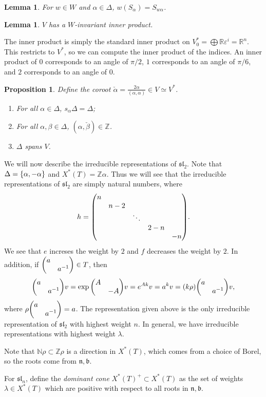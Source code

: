 \documentclass[leqno, openany]{memoir}
\newtheorem{prop}[thm]{Proposition}
\newtheorem{lem}[thm]{Lemma}
\theoremstyle{definition}
\theoremstyle{remark}
\theoremstyle{plain}
\theoremstyle{definition}
\theoremstyle{remark}
\newcommand{\R}{\mathbb{R}}
\newcommand{\Z}{\mathbb{Z}}
\newcommand{\ep}{\varepsilon}
\newcommand{\mf}[1]{\mathfrak{#1}}
\newcommand{\mb}[1]{\mathbb{#1}}
\begin{document}
\begin{lem}
    For $w \in W$ and $\alpha \in \Delta$, $w(S_{\alpha}) = S_{w\alpha}$.
\end{lem}

\begin{lem}
    $V$ has a $W$-invariant inner product.
\end{lem}

The inner product is simply the standard inner product on $V_0^* = \bigoplus \R \ep^i = \R^n$. This restricts to $V^*$, so we can compute the inner product of the indices. An inner product of $0$ corresponds to an angle of $\pi/2$, $1$ corresponds to an angle of $\pi/6$, and $2$ corresponds to an angle of $0$.

\begin{prop}
    Define the coroot $\check{\alpha} = \frac{2 \alpha}{(\alpha, \alpha)} \in V \simeq V^*$.
    \begin{enumerate}
        \item For all $\alpha \in \Delta$, $s_{\alpha} \Delta = \Delta$;
        \item For all $\alpha, \beta \in \Delta$, $(\alpha, \check{\beta}) \in \Z$.
        \item $\Delta$ spans $V$.
    \end{enumerate}
\end{prop}

We will now describe the irreducible representations of $\mf{sl}_2$. Note that $\Delta = \qty{\alpha, -\alpha}$ and $X^*(T) = \Z \alpha$. Thus we will see that the irreducible representations of $\mf{sl}_2$ are simply natural numbers, where
\[ h = \mqty(\dmat{n,n-2,\ddots,2-n,-n}). \]
We see that $e$ increses the weight by $2$ and $f$ decreases the weight by $2$. In addition, if $\mqty(\dmat{a,a^{-1}}) \in T$, then 
\[ \mqty(\dmat{a,a^{-1}}) v = \exp \mqty(\dmat{A,-A}) v = e^{Ak} v = a^k v = (k\rho) \mqty(\dmat{a,a^{-1}}) v, \]
where $\rho \mqty(\dmat{a,a^{-1}}) = a$. The representation given above is the only irreducible representation of $\mf{sl}_2$ with highest weight $n$. In general, we have irreducible representations with highest weight $\lambda$.

Note that $\mb{N} \rho \subset \Z \rho$ is a direction in $X^*(T)$, which comes from a choice of Borel, so the roots come from $\mf{n}, \mf{b}$.

For $\mf{sl}_n$, define the \textit{dominant cone} $X^*(T)^+ \subset X^*(T)$ as the set of weights $\lambda \in X^*(T)$ which are positive with respect to all roots in $\mf{n}, \mf{b}$.
\end{document}
